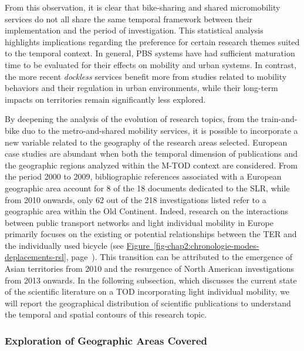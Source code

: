 \begin{refsegment}
From this observation, it is clear that bike-sharing and shared micromobility services do not all share the same temporal framework between their implementation and the period of investigation. This statistical analysis highlights implications regarding the preference for certain research themes suited to the temporal context. In general, \acrshort{PBS} systems have had sufficient maturation time to be evaluated for their effects on mobility and urban systems. In contrast, the more recent \textsl{dockless} services benefit more from studies related to mobility behaviors and their regulation in urban environments, while their long-term impacts on territories remain significantly less explored.%

By deepening the analysis of the evolution of research topics, from the train-and-bike duo to the metro-and-shared mobility services, it is possible to incorporate a new variable related to the geography of the research areas selected. European case studies are abundant when both the temporal dimension of publications and the geographic regions analyzed within the \acrshort{M-TOD} context are considered. From the period 2000 to 2009, bibliographic references associated with a European geographic area account for 8 of the 18 documents dedicated to the \acrshort{SLR}, while from 2010 onwards, only 62 out of the 218 investigations listed refer to a geographic area within the Old Continent. Indeed, research on the interactions between public transport networks and light individual mobility in Europe primarily focuses on the existing or potential relationships between the \acrshort{TER} and the individually used bicycle (see \hyperref[fig-chap2:chronologie-modes-deplacements-rsl]{Figure~\ref{fig-chap2:chronologie-modes-deplacements-rsl}}, page~\pageref{fig-chap2:chronologie-modes-deplacements-rsl}). This transition can be attributed to the emergence of Asian territories from 2010 and the resurgence of North American investigations from 2013 onwards. In the following subsection, which discusses the current state of the scientific literature on a \acrshort{TOD} incorporating light individual mobility, we will report the geographical distribution of scientific publications to understand the temporal and spatial contours of this research topic.%

\subsubsection*{Exploration of Geographic Areas Covered
    \label{chap2:exploration-terrains-geographiques}
    }


\end{refsegment}
